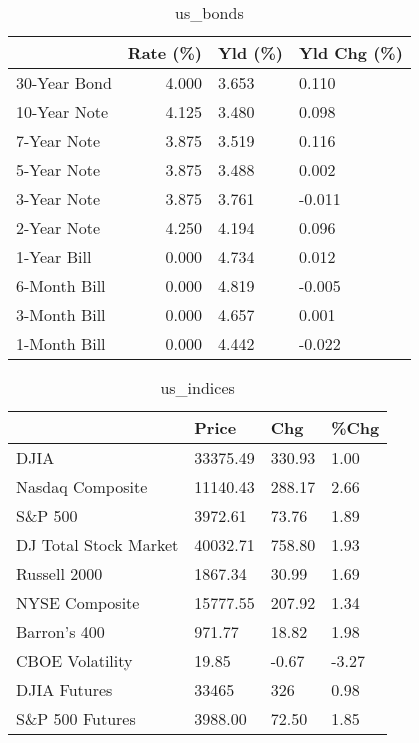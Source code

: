\documentclass{article}%
\begin{document}
%


\begin{table}[htbp]%
\caption{us\_bonds}%
\centering%
\begin{adjustbox}{width=1\textwidth}%
\begin{tabular}{lrll}
\toprule
             &  Rate (\%) & Yld (\%) & Yld Chg (\%) \\
\midrule
30-Year Bond &     4.000 &   3.653 &       0.110 \\
10-Year Note &     4.125 &   3.480 &       0.098 \\
 7-Year Note &     3.875 &   3.519 &       0.116 \\
 5-Year Note &     3.875 &   3.488 &       0.002 \\
 3-Year Note &     3.875 &   3.761 &      -0.011 \\
 2-Year Note &     4.250 &   4.194 &       0.096 \\
 1-Year Bill &     0.000 &   4.734 &       0.012 \\
6-Month Bill &     0.000 &   4.819 &      -0.005 \\
3-Month Bill &     0.000 &   4.657 &       0.001 \\
1-Month Bill &     0.000 &   4.442 &      -0.022 \\
\bottomrule
\end{tabular}
%
\end{adjustbox}%
\end{table}

%


\begin{table}[htbp]%
\caption{us\_indices}%
\centering%
\begin{adjustbox}{width=1\textwidth}%
\begin{tabular}{llll}
\toprule
                      &    Price &    Chg &  \%Chg \\
\midrule
                 DJIA & 33375.49 & 330.93 &  1.00 \\
     Nasdaq Composite & 11140.43 & 288.17 &  2.66 \\
              S\&P 500 &  3972.61 &  73.76 &  1.89 \\
DJ Total Stock Market & 40032.71 & 758.80 &  1.93 \\
         Russell 2000 &  1867.34 &  30.99 &  1.69 \\
       NYSE Composite & 15777.55 & 207.92 &  1.34 \\
         Barron's 400 &   971.77 &  18.82 &  1.98 \\
      CBOE Volatility &    19.85 &  -0.67 & -3.27 \\
         DJIA Futures &    33465 &    326 &  0.98 \\
      S\&P 500 Futures &  3988.00 &  72.50 &  1.85 \\
\bottomrule
\end{tabular}
%
\end{adjustbox}%
\end{table}
\end{document}
